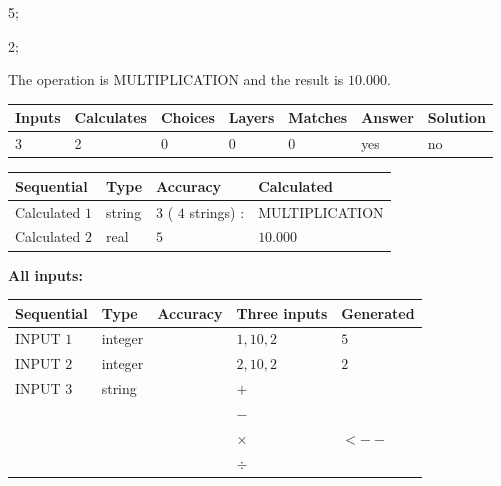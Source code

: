 \documentclass[12pt]{article}
\begin{document}
 

5;
 
2;
 
The operation is  %
MULTIPLICATION and the result is
$ %
10.000$.
 
 
 
\noindent{}
 
 

 
\vspace{0.3in}
   
   
   
   
\noindent\begin{tabular}{|l|l|l|l|l|l|l|}
 \hline
Inputs & Calculates & Choices & Layers & Matches & Answer & Solution \\ \hline
           3 & 
           2 & 
           0
  & 
           0 & 
           0 & 
  yes & 
  no 
  \\ \hline
 \end{tabular}
   
   
   
   
\noindent{}
   
   
  
  
\noindent\begin{tabular}{|l|l|l|l|}
\hline
 Sequential & Type & Accuracy & Calculated \\ 
\hline
 
 
  Calculated $           1$ & string & $           3 $ ( $          4 $ strings)
 : 
 & MULTIPLICATION
 \\  \hline  
 
 
  Calculated $           2$ & real & $           5 $ & 
 $ 10.000 $ 
 \\  \hline  
 \end{tabular}
   
   
   
   
\noindent\vspace{0.1in}\hspace{-0.08in} {\textbf{\Large{All inputs: }}}
   
   
  
  
\noindent\begin{tabular}{|l|l|l|l|l|}
\hline
 Sequential & Type & Accuracy & Three inputs & Generated \\ 
\hline
 
 
  INPUT $           1$ & integer &  & $
 1
 , 
 10
 , 
 2
 $ & $ 5 $ 
 \\  \hline  
 
 
  INPUT $           2$ & integer &  & $
 2
 , 
 10
 , 
 2
 $ & $ 2 $ 
 \\  \hline  
 
 
  INPUT $           3$ & string & & 
 $+$ & 
  \\
  & & & 
 $-$ & 
  \\
  & & & 
 $\times$ & 
  $ <-- $ 
  \\
  & & & 
 $\div$ & 
 \\  \hline  
 \end{tabular}
   
\end{document}
